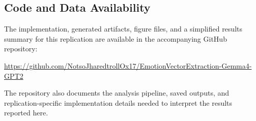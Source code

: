 \subsection*{Code and Data Availability}

The implementation, generated artifacts, figure files, and a simplified results summary for this replication are available in the 
accompanying GitHub repository:

\url{https://github.com/NotsoJharedtrollOx17/EmotionVectorExtraction-Gemma4-GPT2}

The repository also documents the analysis pipeline, saved outputs, and replication-specific implementation details needed to 
interpret the results reported here.